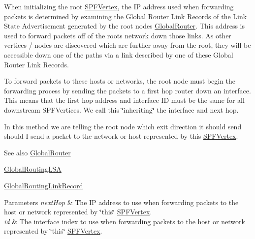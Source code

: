 When initializing the root \hyperlink{classns3_1_1SPFVertex}{S\+P\+F\+Vertex}, the IP address used when forwarding packets is determined by examining the Global Router Link Records of the Link State Advertisement generated by the root node\textquotesingle{}s \hyperlink{classns3_1_1GlobalRouter}{Global\+Router}. This address is used to forward packets off of the root\textquotesingle{}s network down those links. As other vertices / nodes are discovered which are further away from the root, they will be accessible down one of the paths via a link described by one of these Global Router Link Records.

To forward packets to these hosts or networks, the root node must begin the forwarding process by sending the packets to a first hop router down an interface. This means that the first hop address and interface ID must be the same for all downstream S\+P\+F\+Vertices. We call this \char`\"{}inheriting\char`\"{} the interface and next hop.

In this method we are telling the root node which exit direction it should send should I send a packet to the network or host represented by \textquotesingle{}this\textquotesingle{} \hyperlink{classns3_1_1SPFVertex}{S\+P\+F\+Vertex}.

\begin{DoxySeeAlso}{See also}
\hyperlink{classns3_1_1GlobalRouter}{Global\+Router} 

\hyperlink{classns3_1_1GlobalRoutingLSA}{Global\+Routing\+L\+SA} 

\hyperlink{classns3_1_1GlobalRoutingLinkRecord}{Global\+Routing\+Link\+Record} 
\end{DoxySeeAlso}

\begin{DoxyParams}{Parameters}
{\em next\+Hop} & The IP address to use when forwarding packets to the host or network represented by \char`\"{}this\char`\"{} \hyperlink{classns3_1_1SPFVertex}{S\+P\+F\+Vertex}. \\
\hline
{\em id} & The interface index to use when forwarding packets to the host or network represented by \char`\"{}this\char`\"{} \hyperlink{classns3_1_1SPFVertex}{S\+P\+F\+Vertex}. \\
\hline
\end{DoxyParams}

